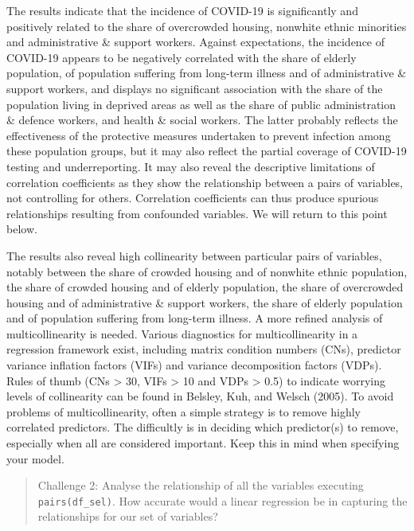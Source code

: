 \documentclass[
  letterpaper,
  krantz2]{style/krantz}
\begin{document}
The results indicate that the incidence of COVID-19 is significantly and
positively related to the share of overcrowded housing, nonwhite ethnic
minorities and administrative \& support workers. Against expectations,
the incidence of COVID-19 appears to be negatively correlated with the
share of elderly population, of population suffering from long-term
illness and of administrative \& support workers, and displays no
significant association with the share of the population living in
deprived areas as well as the share of public administration \& defence
workers, and health \& social workers. The latter probably reflects the
effectiveness of the protective measures undertaken to prevent infection
among these population groups, but it may also reflect the partial
coverage of COVID-19 testing and underreporting. It may also reveal the
descriptive limitations of correlation coefficients as they show the
relationship between a pairs of variables, not controlling for others.
Correlation coefficients can thus produce spurious relationships
resulting from confounded variables. We will return to this point below.

The results also reveal high collinearity between particular pairs of
variables, notably between the share of crowded housing and of nonwhite
ethnic population, the share of crowded housing and of elderly
population, the share of overcrowded housing and of administrative \&
support workers, the share of elderly population and of population
suffering from long-term illness. A more refined analysis of
multicollinearity is needed. Various diagnostics for multicollinearity
in a regression framework exist, including matrix condition numbers
(CNs), predictor variance inflation factors (VIFs) and variance
decomposition factors (VDPs). Rules of thumb (CNs \textgreater{} 30,
VIFs \textgreater{} 10 and VDPs \textgreater{} 0.5) to indicate worrying
levels of collinearity can be found in Belsley, Kuh, and Welsch (2005).
To avoid problems of multicollinearity, often a simple strategy is to
remove highly correlated predictors. The difficultly is in deciding
which predictor(s) to remove, especially when all are considered
important. Keep this in mind when specifying your model.

\begin{quote}
Challenge 2: Analyse the relationship of all the variables executing
\texttt{pairs(df\_sel)}. How accurate would a linear regression be in
capturing the relationships for our set of variables?
\end{quote}
\end{document}
